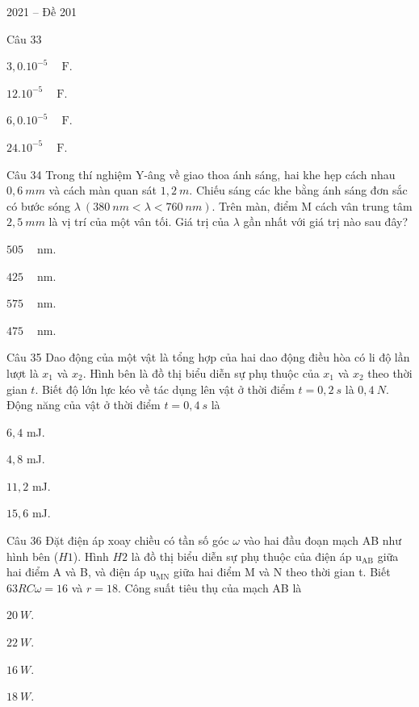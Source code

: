 \documentclass{book}
\begin{document}
\begin{quiz}{2021 – Đề 201}
\begin{multi}[points=1]{Câu 33}
\item  $3,{{0.10}^{-5}}\text{ }\!\!~\!\!\text{ F}$.	
\item  ${{12.10}^{-5}}\text{ }\!\!~\!\!\text{ F}$.	
\item  $6,{{0.10}^{-5}}\text{ }\!\!~\!\!\text{ F}$.	
\item*  ${{24.10}^{-5}}\text{ }\!\!~\!\!\text{ F}$.
\end{multi}

\begin{multi}[points=1]{Câu 34}
 Trong thí nghiệm Y-âng về giao thoa ánh sáng, hai khe hẹp cách nhau $0,6~mm$ và cách màn quan sát $1,2~m$. Chiếu sáng các khe bằng ánh sáng đơn sắc có bước sóng $\lambda ~(380~nm<\lambda <760~nm)$. Trên màn, điểm M cách vân trung tâm $2,5~mm$ là vị trí của một vân tối. Giá trị của $\lambda $ gần nhất với giá trị nào sau đây? 

\item*  $505\text{ }\!\!~\!\!\text{ nm}$.	
\item  $425\text{ }\!\!~\!\!\text{ nm}$.	
\item  $575\text{ }\!\!~\!\!\text{ nm}$.	
\item  $475\text{ }\!\!~\!\!\text{ nm}$.
\end{multi}

\begin{multi}[points=1]{Câu 35}
 Dao động của một vật là tổng hợp của hai dao động điều hòa có li độ lần lượt là ${{x}_{1}}$ và ${{x}_{2}}$. Hình bên là đồ thị biểu diễn sự phụ thuộc của ${{x}_{1}}$ và ${{x}_{2}}$ theo thời gian $t$. Biết độ lớn lực kéo về tác dụng lên vật ở thời điểm $t=0,2~s$ là $0,4~N$. Động năng của vật ở thời điểm $t=0,4~s$ là

\item  $6,4$ mJ.	
\item*  $4,8$ mJ.	
\item  $11,2$ mJ.	
\item  $15,6$ mJ. 
\end{multi}

\begin{multi}[points=1]{Câu 36}
 Đặt điện áp xoay chiều có tần số góc $\omega $ vào hai đầu đoạn mạch AB như hình bên ($H1$). Hình $H2$ là đồ thị biểu diễn sự phụ thuộc của điện áp ${{\text{u}}_{\text{AB}}}$ giữa hai điểm A và B, và điện áp ${{\text{u}}_{\text{MN}}}$ giữa hai điểm M và N theo thời gian t. Biết $63RC\omega =16$ và $r=18.$ Công suất tiêu thụ của mạch AB là

\item*  $20~W$.	
\item  $22~W$.	
\item  $16~W$.	
\item  $18~W$. 
\end{multi}


\end{quiz}
\end{document}
